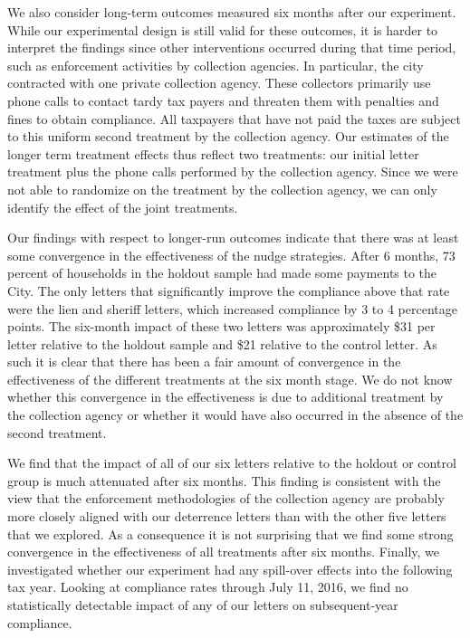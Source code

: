 \documentclass[12pt]{article}
\begin{document}
We also consider long-term outcomes measured six months after our
experiment. While our experimental design is still valid for these
outcomes, it is harder to interpret the findings since other
interventions occurred during that time period, such as enforcement
activities by collection agencies. In particular, the city contracted
with one private collection agency. These collectors primarily use
phone calls to contact tardy tax payers and threaten them with
penalties and fines to obtain compliance. All taxpayers that have not
paid the taxes are subject to this uniform second treatment by the
collection agency.  Our estimates of the longer term treatment effects
thus reflect two treatments: our initial letter treatment plus the
phone calls performed by the collection agency. Since we were not able
to randomize on the treatment by the collection agency, we can only
identify the effect of the joint treatments.

Our findings with respect to longer-run outcomes indicate that there
was at least some convergence in the effectiveness of the nudge
strategies. After 6 months, 73 percent of households in the holdout
sample had made some payments to the City. The only letters that
significantly improve the compliance above that rate were the lien and
sheriff letters, which increased compliance by 3 to 4 percentage
points. The six-month impact of these two letters was approximately
\$31 per letter relative to the holdout sample and \$21 relative to
the control letter. As such it is clear that there has been a fair
amount of convergence in the effectiveness of the different treatments
at the six month stage. We do not know whether this convergence in the
effectiveness is due to additional treatment by the collection agency
or whether it would have also occurred in the absence of the second
treatment.

We find that the impact of all of our six letters relative to the
holdout or control group is much attenuated after six months. This
finding is consistent with the view that the enforcement methodologies
of the collection agency are probably more closely aligned with our
deterrence letters than with the other five letters that we
explored. As a consequence it is not surprising that we find some
strong convergence in the effectiveness of all treatments after six
months. Finally, we investigated whether our experiment had any
spill-over effects into the following tax year. Looking at compliance
rates through July 11, 2016, we find no statistically detectable
impact of any of our letters on subsequent-year compliance.
\end{document}
